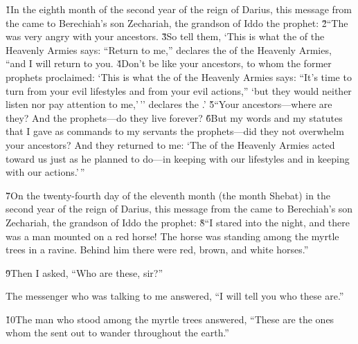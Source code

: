 


\v{1}In the eighth month of the second year of the reign of Darius, this message from the  came to Berechiah's son Zechariah, the grandson of Iddo the prophet: \v{2}``The  was very angry with your ancestors. \v{3}So tell them, `This is what the  of the Heavenly Armies says: ``Return to me,'' declares the  of the Heavenly Armies, ``and I will return to you. \v{4}Don't be like your ancestors, to whom the former prophets proclaimed: `This is what the  of the Heavenly Armies says: ``It's time to turn from your evil lifestyles and from your evil actions,'' `but they would neither listen nor pay attention to me,'\,'' declares the .' \v{5}``Your ancestors---where are they? And the prophets---do they live forever? \v{6}But my words and my statutes that I gave as commands to my servants the prophets---did they not overwhelm your ancestors? And they returned to me: `The  of the Heavenly Armies acted toward us just as he planned to do---in keeping with our lifestyles and in keeping with our actions.'\,''

\v{7}On the twenty-fourth day of the eleventh month (the month Shebat) in the second year of the reign of Darius, this message from the  came to Berechiah's son Zechariah, the grandson of Iddo the prophet: \v{8}``I stared into the night, and there was a man mounted on a red horse! The horse was standing among the myrtle trees in a ravine. Behind him there were red, brown, and white horses.''

\v{9}Then I asked, ``Who are these, sir?''

The messenger who was talking to me answered, ``I will tell you who these are.''

\v{10}The man who stood among the myrtle trees answered, ``These are the ones whom the  sent out to wander throughout the earth.''

